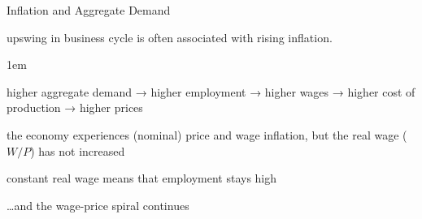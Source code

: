 \documentclass[11pt,aspectratio=43,usenames,dvipsnames]{beamer}
\let\olditemize=\itemize
\let\endolditemize=\enditemize
\renewenvironment{itemize}{\olditemize \itemsep1em}{\endolditemize}
\theoremstyle{definition}
\begin{document}
\begin{frame}{Inflation and Aggregate Demand}
\label{slide:Inflation_and_Aggregate_Demand}
    \begin{center}
         upswing in business cycle is often associated with rising inflation.
    \end{center}
    \begin{itemize}
        \item higher aggregate demand → higher employment → higher wages → higher cost of production → higher prices
        \item the economy experiences (nominal) price and wage inflation, but the \alert{real wage ($W/P$)} has not increased
        \item constant real wage means that employment stays high
        \item \ldots and the wage-price spiral continues

    \end{itemize}

\end{frame}
\end{document}
